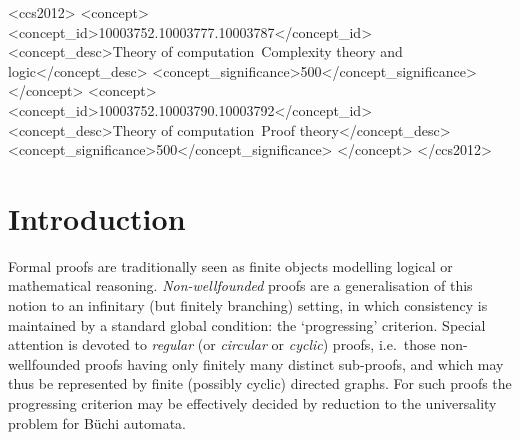 \documentclass[manuscript,screen]{acmart}
\theoremstyle{definition}
\theoremstyle{remark}
\begin{document}
\begin{CCSXML}
<ccs2012>
   <concept>
       <concept_id>10003752.10003777.10003787</concept_id>
       <concept_desc>Theory of computation~Complexity theory and logic</concept_desc>
       <concept_significance>500</concept_significance>
       </concept>
   <concept>
       <concept_id>10003752.10003790.10003792</concept_id>
       <concept_desc>Theory of computation~Proof theory</concept_desc>
       <concept_significance>500</concept_significance>
       </concept>
 </ccs2012>
\end{CCSXML}





\maketitle


\section{Introduction}
Formal proofs are traditionally seen as finite objects modelling  logical or mathematical reasoning. 
\emph{Non-wellfounded} proofs are a generalisation of this notion to an infinitary (but finitely branching) setting, in which consistency is maintained by a standard global condition: the `progressing' criterion. 
% 
Special attention is devoted to \emph{regular} (or \emph{circular} or \emph{cyclic}) proofs, i.e.~those non-wellfounded proofs having only finitely many distinct sub-proofs, and which may thus be represented by finite (possibly cyclic) directed graphs. 
For such proofs the progressing criterion may be effectively decided by reduction to the universality problem for B\"uchi automata.
\end{document}
